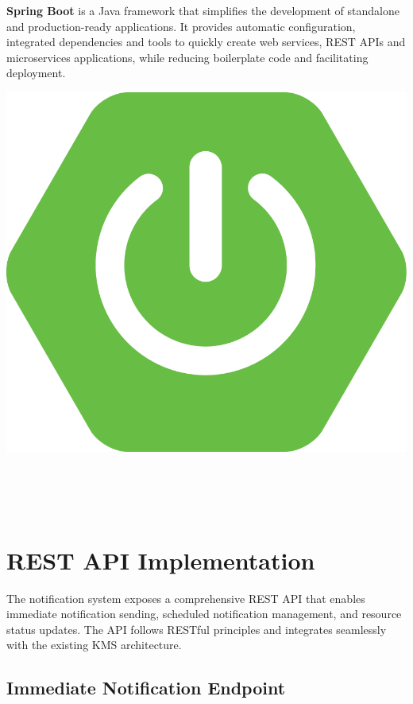 \vspace{0.5cm}

\noindent%
\begin{minipage}{.7\textwidth}%
    \textbf{Spring Boot} is a Java framework that simplifies the development of standalone and production-ready applications. It provides automatic configuration, integrated dependencies and tools to quickly create web services, REST APIs and microservices applications, while reducing boilerplate code and facilitating deployment.
\end{minipage}%
\hfill
\begin{minipage}{.20\textwidth}%
\includegraphics[width=\textwidth]{images/spring_boot.png}
\end{minipage} \\ \\ \\

\section{REST API Implementation}

The notification system exposes a comprehensive REST API that enables immediate notification sending, scheduled notification management, and resource status updates. The API follows RESTful principles and integrates seamlessly with the existing KMS architecture.

\subsection{Immediate Notification Endpoint}


